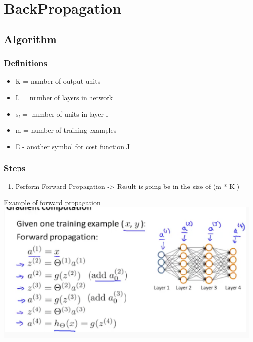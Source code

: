 \section{BackPropagation}\label{backpropagation}

\subsection{Algorithm}\label{algorithm}

\subsubsection{Definitions}\label{definitions}

\begin{itemize}
\tightlist
\item
  K = number of output units\\
\item
  L = number of layers in network\\
\item
  \(s_{l} =\) number of units in layer l
\item
  m = number of training examples
\item
  E - another symbol for cost function J
\end{itemize}

\subsubsection{Steps}\label{steps}

\begin{enumerate}
\def\labelenumi{\arabic{enumi}.}
\tightlist
\item
  Perform Forward Propagation -\textgreater{} Result is going be in the
  size of (m * K )
\end{enumerate}

Example of forward propagation\\
\includegraphics{forwardProp.png}

